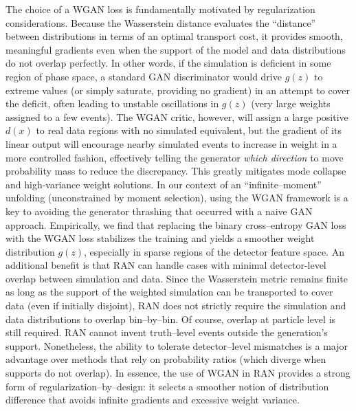             The choice of a WGAN loss is fundamentally motivated by regularization considerations.
            Because the Wasserstein distance evaluates the “distance” between distributions in terms of an optimal transport cost, it provides smooth, meaningful gradients even when the support of the model and data distributions do not overlap perfectly.\kd{}
            In other words, if the simulation is deficient in some region of phase space, a standard GAN discriminator would drive $g(z)$ to extreme values (or simply saturate, providing no gradient) in an attempt to cover the deficit, often leading to unstable oscillations in $g(z)$ (very large weights assigned to a few events).
            The WGAN critic, however, will assign a large positive $d(x)$ to real data regions with no simulated equivalent, but the gradient of its linear output will encourage nearby simulated events to increase in weight in a more controlled fashion, effectively telling the generator \emph{which direction} to move probability mass to reduce the discrepancy.
            This greatly mitigates mode collapse and high-variance weight solutions.\kd{}
            In our context of an “infinite--moment” unfolding (unconstrained by moment selection), using the WGAN framework is a key to avoiding the generator thrashing that occurred with a naive GAN approach.
            Empirically, we find that replacing the binary cross--entropy GAN loss with the WGAN loss stabilizes the training and yields a smoother weight distribution $g(z)$, especially in sparse regions of the detector feature space.
            An additional benefit is that RAN can handle cases with {minimal detector-level overlap} between simulation and data.
            Since the Wasserstein metric remains finite as long as the support of the weighted simulation can be transported to cover data (even if initially disjoint), RAN does not strictly require the simulation and data distributions to overlap bin--by--bin.
            Of course, overlap at particle level is still required.
            RAN cannot invent truth--level events outside the generation’s support.
            Nonetheless, the ability to tolerate detector--level mismatches is a major advantage over methods that rely on probability ratios (which diverge when supports do not overlap).
            In essence, the use of WGAN in RAN provides a strong form of regularization--by--design: it selects a smoother notion of distribution difference that avoids infinite gradients and excessive weight variance.
